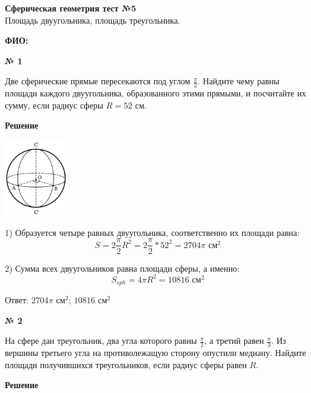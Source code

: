 


    \begin{center}
        \textbf{Сферическая геометрия тест №5}\\
        Площадь двуугольника, площадь треугольника.
    \end{center}

    \textbf{ФИО:}

    \begin{center}
        \textbf{№ 1}
    \end{center}

     Две сферические прямые пересекаются под углом $\frac{\pi}{2}$.
    Найдите чему равны площади каждого двуугольника, образованного этими прямыми, и посчитайте их сумму,
    если радиус сферы $R=52$ см.

     \textbf{Решение}\\

    \begin{center}
        \includegraphics[width=0.2\textwidth]{images/img1}\\
    \end{center}

    1) Образуется четыре равных двуугольника, соответственно их площади равна:
    \[
        S = 2\frac{\pi}{2}R^2 = 2 \frac{\pi}{2} * 52^2 = 2704\pi \text{ см}^2
    \]

    2) Сумма всех двуугольников равна площади сферы, а именно:
    \[
        S_{sph} = 4\pi R^2   =10816 \text{ см}^2
    \]

    Ответ: $2704\pi \text{ см}^2$;  $10816 \text{ см}^2$

    \begin{center}
        \textbf{№ 2}
    \end{center}

    На сфере дан треугольник, два угла которого равны $\frac{\pi}{2}$, а третий равен $\frac{\pi}{3}$.
    Из вершины третьего угла на противолежащую сторону опустили медиану.
    Найдите площади получившихся треугольников, если радиус сферы равен $R$.

    \textbf{Решение}\\

